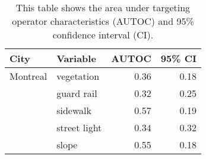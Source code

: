 \begin{table}[!htp]\centering
\caption{This table shows the area under targeting operator characteristics (AUTOC) and 95\% confidence interval (CI).}
\label{result:tab:autoc}
\scriptsize
\begin{tabular}{llrr}\toprule
City & Variable & AUTOC & 95\% CI \\\midrule
Montreal & vegetation & 0.36 & 0.18 \\
 & guard rail & 0.32 & 0.25 \\
 & sidewalk & 0.57 & 0.19 \\
 & street light & 0.34 & 0.32 \\
 & slope & 0.55 & 0.18 \\
\bottomrule
\end{tabular}
\end{table}

